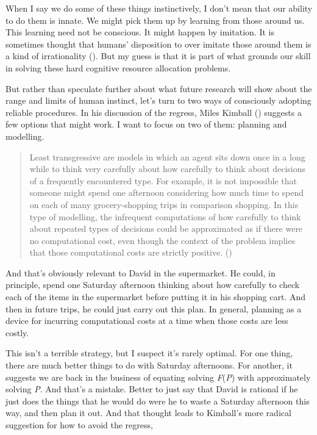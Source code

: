 \documentclass[
  11pt,
  letterpaper,
  DIV=11,
  numbers=noendperiod,
  twoside]{scrartcl}
\begin{document}
When I say we do some of these things instinctively, I don't mean that
our ability to do them is innate. We might pick them up by learning from
those around us. This learning need not be conscious. It might happen by
imitation. It is sometimes thought that humans' disposition to over
imitate those around them is a kind of irrationality
(). But my guess is
that it is part of what grounds our skill in solving these hard
cognitive resource allocation problems.

But rather than speculate further about what future research will show
about the range and limits of human instinct, let's turn to two ways of
consciously adopting reliable procedures. In his discussion of the
regress, Miles Kimball () suggests a few
options that might work. I want to focus on two of them: planning and
modelling.

\begin{quote}
Least transgressive are models in which an agent sits down once in a
long while to think very carefully about how carefully to think about
decisions of a frequently encountered type. For example, it is not
impossible that someone might spend one afternoon considering how much
time to spend on each of many grocery-shopping trips in comparison
shopping. In this type of modelling, the infrequent computations of how
carefully to think about repeated types of decisions could be
approximated as if there were no computational cost, even though the
context of the problem implies that those computational costs are
strictly positive. ()
\end{quote}

And that's obviously relevant to David in the supermarket. He could, in
principle, spend one Saturday afternoon thinking about how carefully to
check each of the items in the supermarket before putting it in his
shopping cart. And then in future trips, he could just carry out this
plan. In general, planning as a device for incurring computational costs
at a time when those costs are less costly.

This isn't a terrible strategy, but I suspect it's rarely optimal. For
one thing, there are much better things to do with Saturday afternoons.
For another, it suggests we are back in the business of equating solving
\emph{F}(\emph{P}) with approximately solving \emph{P}. And that's a
mistake. Better to just say that David is rational if he just does the
things that he would do were he to waste a Saturday afternoon this way,
and then plan it out. And that thought leads to Kimball's more radical
suggestion for how to avoid the regress,
\end{document}
